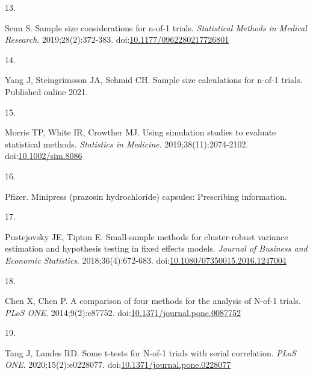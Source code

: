 \documentclass[
  11pt,
]{article}
\newlength{\cslhangindent}
\newlength{\csllabelwidth}
\newenvironment{CSLReferences}[2] %
 {\begin{list}{}{%
  \setlength{\itemindent}{0pt}
  \setlength{\leftmargin}{0pt}
  \setlength{\parsep}{0pt}
  \ifodd #1
   \setlength{\leftmargin}{\cslhangindent}
   \setlength{\itemindent}{-1\cslhangindent}
  \fi
  \setlength{\itemsep}{#2\baselineskip}}}
 {\end{list}}
\newcommand{\CSLLeftMargin}[1]{\parbox[t]{\csllabelwidth}{\strut#1\strut}}
\newcommand{\CSLRightInline}[1]{\parbox[t]{\linewidth - \csllabelwidth}{\strut#1\strut}}
\begin{document}
\begin{CSLReferences}{0}{1}
\CSLLeftMargin{13. }%
\CSLRightInline{Senn S. Sample size considerations for n-of-1 trials. \emph{Statistical Methods in Medical Research}. 2019;28(2):372-383. doi:\href{https://doi.org/10.1177/0962280217726801}{10.1177/0962280217726801}}

\CSLLeftMargin{14. }%
\CSLRightInline{Yang J, Steingrimsson JA, Schmid CH. Sample size calculations for n-of-1 trials. Published online 2021.}

\CSLLeftMargin{15. }%
\CSLRightInline{Morris TP, White IR, Crowther MJ. Using simulation studies to evaluate statistical methods. \emph{Statistics in Medicine}. 2019;38(11):2074-2102. doi:\href{https://doi.org/10.1002/sim.8086}{10.1002/sim.8086}}

\CSLLeftMargin{16. }%
\CSLRightInline{Pfizer. {Minipress} (prazosin hydrochloride) capsules: Prescribing information.}

\CSLLeftMargin{17. }%
\CSLRightInline{Pustejovsky JE, Tipton E. Small-sample methods for cluster-robust variance estimation and hypothesis testing in fixed effects models. \emph{Journal of Business and Economic Statistics}. 2018;36(4):672-683. doi:\href{https://doi.org/10.1080/07350015.2016.1247004}{10.1080/07350015.2016.1247004}}

\CSLLeftMargin{18. }%
\CSLRightInline{Chen X, Chen P. A comparison of four methods for the analysis of {N}-of-1 trials. \emph{PLoS ONE}. 2014;9(2):e87752. doi:\href{https://doi.org/10.1371/journal.pone.0087752}{10.1371/journal.pone.0087752}}

\CSLLeftMargin{19. }%
\CSLRightInline{Tang J, Landes RD. Some t-tests for {N}-of-1 trials with serial correlation. \emph{PLoS ONE}. 2020;15(2):e0228077. doi:\href{https://doi.org/10.1371/journal.pone.0228077}{10.1371/journal.pone.0228077}}

\end{CSLReferences}
\end{document}
